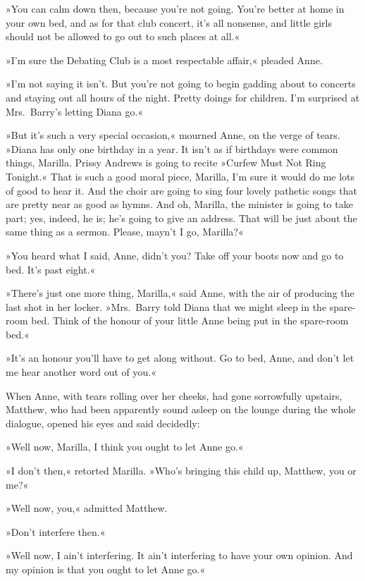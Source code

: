 »You can calm down then, because you're not going. You're better at home in your own bed, and as for that club concert, it's all nonsense, and little girls should not be allowed to go out to such places at all.«

»I'm sure the Debating Club is a most respectable affair,« pleaded Anne.

»I'm not saying it isn't. But you're not going to begin gadding about to concerts and staying out all hours of the night. Pretty doings for children. I'm surprised at Mrs.~Barry's letting Diana go.«

»But it's such a very special occasion,« mourned Anne, on the verge of tears. »Diana has only one birthday in a year. It isn't as if birthdays were common things, Marilla. Prissy Andrews is going to recite »Curfew Must Not Ring Tonight.« That is such a good moral piece, Marilla, I'm sure it would do me lots of good to hear it. And the choir are going to sing four lovely pathetic songs that are pretty near as good as hymns. And oh, Marilla, the minister is going to take part; yes, indeed, he is; he's going to give an address. That will be just about the same thing as a sermon. Please, mayn't I go, Marilla?«

»You heard what I said, Anne, didn't you? Take off your boots now and go to bed. It's past eight.«

»There's just one more thing, Marilla,« said Anne, with the air of producing the last shot in her locker. »Mrs.~Barry told Diana that we might sleep in the spare-room bed. Think of the honour of your little Anne being put in the spare-room bed.«

»It's an honour you'll have to get along without. Go to bed, Anne, and don't let me hear another word out of you.«

When Anne, with tears rolling over her cheeks, had gone sorrowfully upstairs, Matthew, who had been apparently sound asleep on the lounge during the whole dialogue, opened his eyes and said decidedly:

»Well now, Marilla, I think you ought to let Anne go.«

»I don't then,« retorted Marilla. »Who's bringing this child up, Matthew, you or me?«

»Well now, you,« admitted Matthew.

»Don't interfere then.«

»Well now, I ain't interfering. It ain't interfering to have your own opinion. And my opinion is that you ought to let Anne go.«

